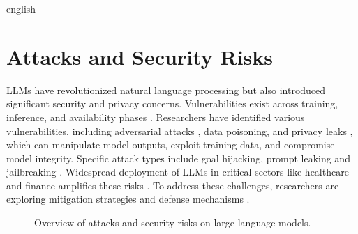 \begin{otherlanguage*}{english}
\begin{figure}[htbp!]
{%
}


\end{figure}

\section{Attacks and Security Risks}

LLMs have revolutionized natural language processing but also introduced significant security and privacy concerns. Vulnerabilities exist across training, inference, and availability phases \cite{Xu2025Survey}. Researchers have identified various vulnerabilities, including adversarial attacks \cite{Schwinn2023Adversarial}, data poisoning, and privacy leaks \cite{Das2025Security}, which can manipulate model outputs, exploit training data, and compromise model integrity. Specific attack types include goal hijacking, prompt leaking and jailbreaking \cite{Perez2022Ignore, shayeganiSurveyVulnerabilitiesLarge2023}. Widespread deployment of LLMs in critical sectors like healthcare and finance amplifies these risks \cite{Debar2024Emerging}. To address these challenges, researchers are exploring mitigation strategies and defense mechanisms \cite{abdaliSecuringLargeLanguage2024a}.


\begin{figure}[ht!]
\centering
\caption{Overview of attacks and security risks on large language models.}
\label{fig:overview-attacks}
\begin{tikzpicture}[
   level distance=2.5cm,
   level 1/.style={sibling distance=55mm},
   edge from parent/.style={->,draw},
   >=latex
]


\end{tikzpicture}
\end{figure}
\end{otherlanguage*}
